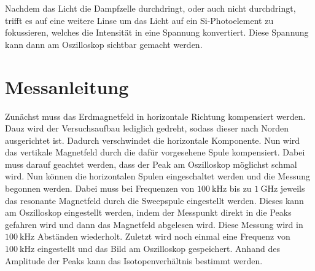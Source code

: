 Nachdem das Licht die Dampfzelle durchdringt, oder auch nicht durchdringt, trifft es auf eine weitere Linse um das Licht auf ein
Si-Photoelement zu fokussieren, welches die Intensität in eine Spannung konvertiert. Diese Spannung kann dann am Oszilloskop sichtbar gemacht werden. 

\section{Messanleitung}
\label{sec:messanleitung}
Zunächst muss das Erdmagnetfeld in horizontale Richtung kompensiert werden. Dauz wird der Versuchsaufbau lediglich gedreht, sodass dieser nach Norden ausgerichtet ist. Dadurch verschwindet
die horizontale Komponente. Nun wird das vertikale Magnetfeld durch die dafür vorgesehene Spule kompensiert. Dabei muss darauf geachtet werden, dass der Peak am Oszilloskop möglichst 
schmal wird. Nun können die horizontalen Spulen eingeschaltet werden und die Messung begonnen werden. Dabei muss bei Frequenzen von $\qty{100}{\kilo\hertz}$ bis zu $\qty{1}{\giga\hertz}$ 
jeweils das resonante Magnetfeld durch die Sweepspule eingestellt werden. Dieses kann am Oszilloskop eingestellt werden, indem der Messpunkt direkt in die Peaks gefahren wird und dann das 
Magnetfeld abgelesen wird. Diese Messung wird in $\qty{100}{\kilo\hertz}$ Abständen wiederholt. Zuletzt wird noch einmal eine Frequenz von $\qty{100}{\kilo\hertz}$ eingestellt und das Bild 
am Oszilloskop gespeichert. Anhand des Amplitude der Peaks kann das Isotopenverhältnis bestimmt werden. 